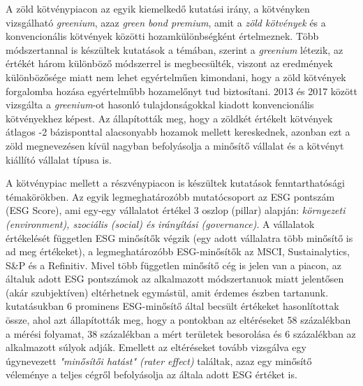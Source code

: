 A zöld kötvénypiacon az egyik kiemelkedő kutatási irány, a kötvényken vizsgálható \textit{greenium}, azaz \textit{green bond premium}, amit a \textit{zöld kötvények} és a konvencionális kötvények közötti hozamkülönbségként értelmeznek. Több módszertannal is készültek kutatások a témában, \textcite{fandella_uncovering_2024} szerint a \textit{greenium} létezik, az értékét három különböző módszerrel is megbecsülték, viszont az eredmények különbözősége miatt nem lehet egyértelműen kimondani, hogy a zöld kötvények forgalomba hozása egyértelműbb hozamelőnyt tud biztosítani. \textcite{zerbib_is_2016} 2013 és 2017 között vizsgálta a \textit{greenium}-ot hasonló tulajdonságokkal kiadott konvencionális kötvényekhez képest. Az állapították meg, hogy a zöldkét értékelt kötvények átlagos -2 bázisponttal alacsonyabb hozamok mellett kereskednek, azonban ezt a zöld megnevezésen kívül nagyban befolyásolja a minősítő vállalat és a kötvényt kiállító vállalat típusa is.

A kötvénypiac mellett a részvénypiacon is készültek kutatások fenntarthatósági témakörökben. Az egyik legmeghatározóbb mutatócsoport az ESG pontszám (ESG Score), ami egy-egy vállalatot értékel 3 oszlop (pillar) alapján: \textit{környezeti (environment), szociális (social) és irányítási (governance)}. A vállalatok értékelését független ESG minősítők végzik (egy adott vállalatra több minősítő is ad meg értékeket), a legmeghatározóbb ESG-minősítők az MSCI, Sustainalytics, S\&P és a Refinitiv. Mivel több független minősítő cég is jelen van a piacon, az általuk adott ESG pontszámok az alkalmazott módszertanuok miatt jelentősen (akár szubjektíven) eltérhetnek egymástül, amit érdemes észben tartanunk. \textcite{berg_aggregate_2022} kutatásukban 6 prominens ESG-minősítő által becsült értékeket hasonlítottak össze, ahol azt állapították meg, hogy a pontokban az eltéréseket 58 százalékban a mérési folyamat, 38 százalékban a mért területek besorolása és 6 százalékban az alkalmazott súlyok adják. Emellett az eltéréseket tovább vizsgálva egy úgynevezett \textit{"minősítői hatást" (rater effect)} találtak, azaz egy minősítő véleménye a teljes cégről befolyásolja az általa adott ESG értéket is.

